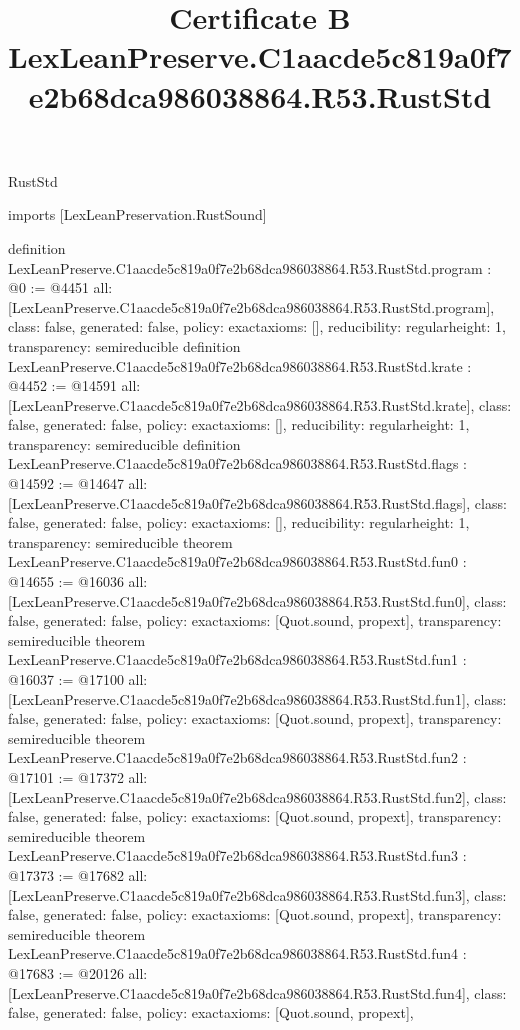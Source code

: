 \begin{lexlean}{RustStd}
\title{Certificate B LexLeanPreserve.C1aacde5c819a0f7e2b68dca986038864.R53.RustStd}
\begin{coremodule}
imports [LexLeanPreservation.RustSound]

definition LexLeanPreserve.C1aacde5c819a0f7e2b68dca986038864.R53.RustStd.program : @0 := @4451 {
  all: [LexLeanPreserve.C1aacde5c819a0f7e2b68dca986038864.R53.RustStd.program],
  class: false,
  generated: false,
  policy: exact{axioms: []},
  reducibility: regular{height: 1},
  transparency: semireducible
}
definition LexLeanPreserve.C1aacde5c819a0f7e2b68dca986038864.R53.RustStd.krate : @4452 := @14591 {
  all: [LexLeanPreserve.C1aacde5c819a0f7e2b68dca986038864.R53.RustStd.krate],
  class: false,
  generated: false,
  policy: exact{axioms: []},
  reducibility: regular{height: 1},
  transparency: semireducible
}
definition LexLeanPreserve.C1aacde5c819a0f7e2b68dca986038864.R53.RustStd.flags : @14592 := @14647 {
  all: [LexLeanPreserve.C1aacde5c819a0f7e2b68dca986038864.R53.RustStd.flags],
  class: false,
  generated: false,
  policy: exact{axioms: []},
  reducibility: regular{height: 1},
  transparency: semireducible
}
theorem LexLeanPreserve.C1aacde5c819a0f7e2b68dca986038864.R53.RustStd.fun0 : @14655 := @16036 {
  all: [LexLeanPreserve.C1aacde5c819a0f7e2b68dca986038864.R53.RustStd.fun0],
  class: false,
  generated: false,
  policy: exact{axioms: [Quot.sound, propext]},
  transparency: semireducible
}
theorem LexLeanPreserve.C1aacde5c819a0f7e2b68dca986038864.R53.RustStd.fun1 : @16037 := @17100 {
  all: [LexLeanPreserve.C1aacde5c819a0f7e2b68dca986038864.R53.RustStd.fun1],
  class: false,
  generated: false,
  policy: exact{axioms: [Quot.sound, propext]},
  transparency: semireducible
}
theorem LexLeanPreserve.C1aacde5c819a0f7e2b68dca986038864.R53.RustStd.fun2 : @17101 := @17372 {
  all: [LexLeanPreserve.C1aacde5c819a0f7e2b68dca986038864.R53.RustStd.fun2],
  class: false,
  generated: false,
  policy: exact{axioms: [Quot.sound, propext]},
  transparency: semireducible
}
theorem LexLeanPreserve.C1aacde5c819a0f7e2b68dca986038864.R53.RustStd.fun3 : @17373 := @17682 {
  all: [LexLeanPreserve.C1aacde5c819a0f7e2b68dca986038864.R53.RustStd.fun3],
  class: false,
  generated: false,
  policy: exact{axioms: [Quot.sound, propext]},
  transparency: semireducible
}
theorem LexLeanPreserve.C1aacde5c819a0f7e2b68dca986038864.R53.RustStd.fun4 : @17683 := @20126 {
  all: [LexLeanPreserve.C1aacde5c819a0f7e2b68dca986038864.R53.RustStd.fun4],
  class: false,
  generated: false,
  policy: exact{axioms: [Quot.sound, propext]},
}
\end{coremodule}
\end{lexlean}
